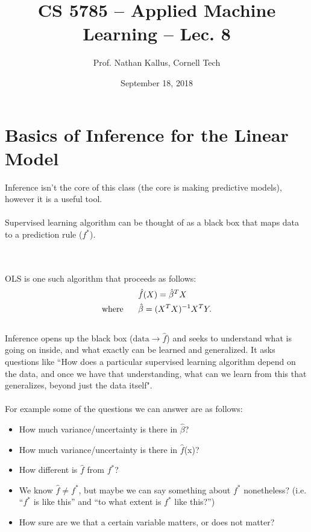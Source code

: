 \documentclass[a4paper]{article}
\title{CS 5785 -- Applied Machine Learning -- Lec. 8}
\author{Prof. Nathan Kallus, Cornell Tech}
\date{September 18, 2018}
\begin{document}
\maketitle

\section*{Basics of Inference for the Linear Model}
Inference isn’t the core of this class (the core is making predictive models), however it is a useful tool.\\ \\
Supervised learning algorithm can be thought of as a black box that maps data to a prediction rule ($f^*$).\\

\\ \\
OLS is one such algorithm that proceeds as follows:
\begin{align*}
&\hat{f}(X)=\hat{\beta}^T X \\
\mbox{where \hspace{0.5cm}}&\hat{\beta}=(X^T X)^{-1}X^T Y.
\end{align*}
\\
Inference opens up the black box ($\mbox{data} \rightarrow \hat{f}$) and seeks to understand what is going on inside, and what exactly can be learned and generalized. It asks questions like “How does a particular supervised learning algorithm depend on the data, and once we have that understanding, what can we learn from this that generalizes, beyond just the data itself". \\ \\
For example some of the questions we can answer are as follows:
\begin{itemize}
\item How much variance/uncertainty is there in $\hat{\beta}$?
\item How much variance/uncertainty is there in $\hat{f}$(x)?
\item How different is $\hat{f}$ from $f^*$?
\item We know $\hat{f}\ne f^*$, but maybe we can say something about $f^*$ nonetheless?
(i.e. “$f^*$ is like this” and “to what extent is $f^*$ like this?”)
\item How sure are we that a certain variable matters, or does not matter?
\end{itemize}
\end{document}
